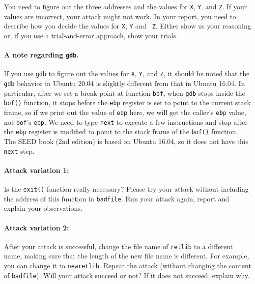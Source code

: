 You need to figure out the three addresses and the values for 
\texttt{X}, \texttt{Y}, and \texttt{Z}. 
If your values are incorrect,
your attack might not work. In your report, you need to
describe how you decide the values for {\tt X}, {\tt Y} and {\tt
Z}. Either show us your reasoning or, if you use a trial-and-error approach,
show your trials.


\paragraph{A note regarding \texttt{gdb}.}  If you use \texttt{gdb} to figure out the 
values for \texttt{X}, \texttt{Y}, and \texttt{Z}, it should be noted
that the \texttt{gdb} behavior in Ubuntu 20.04 is slightly different 
from that in Ubuntu 16.04. In particular, after we set
a break point at function \texttt{bof},  
when \texttt{gdb} stops inside the \texttt{bof()} function, it
stops before the \texttt{ebp} register is set
to point to the current stack frame, so if we print out the value of
\texttt{ebp} here, we will get the caller's \texttt{ebp} value, not
\texttt{bof}'s \texttt{ebp}. We need to type \texttt{next} 
to execute a few instructions and stop
after the \texttt{ebp} register is modified to point to the stack
frame of the \texttt{bof()} function.
The SEED book (2nd edition) is based on Ubuntu 16.04, 
so it does not have this \texttt{next} step. 


\paragraph{Attack variation 1:}
Is the \texttt{exit()} function really necessary? Please try 
your attack without including the address of this function in
\texttt{badfile}. Run your attack again, report and explain your
observations.  



\paragraph{Attack variation 2:} 
After your attack is successful, change the file name of \texttt{retlib}
to a different name, making sure that the length of the new 
file name is different. For example, you can change it to \texttt{newretlib}. 
Repeat the attack (without changing the content of {\tt badfile}). 
Will your attack succeed or not?  If it does not succeed, explain why.



